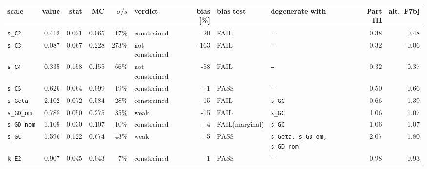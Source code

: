 \begin{tabular}{lrrrrlrll rr}
\toprule
scale & value & stat & MC & $\sigma/s$ & verdict & bias [\%] & bias test & degenerate with & Part III & alt.\ F7bj \\
\midrule
\texttt{s\_C2} & 0.412 & 0.021 & 0.065 & 17\% & constrained & -20 & FAIL & \texttt{--} & 0.38 & 0.48 \\
\texttt{s\_C3} & -0.087 & 0.067 & 0.228 & 273\% & not constrained & -163 & FAIL & \texttt{--} & 0.32 & -0.06 \\
\texttt{s\_C4} & 0.335 & 0.158 & 0.155 & 66\% & not constrained & -58 & FAIL & \texttt{--} & 0.32 & 0.37 \\
\texttt{s\_C5} & 0.626 & 0.064 & 0.099 & 19\% & constrained & +1 & PASS & \texttt{--} & 0.50 & 0.66 \\
\texttt{s\_Geta} & 2.102 & 0.072 & 0.584 & 28\% & constrained & -15 & FAIL & \texttt{s\_GC} & 0.66 & 1.39 \\
\texttt{s\_GD\_om} & 0.788 & 0.050 & 0.275 & 35\% & weak & -15 & FAIL & \texttt{s\_GC} & 1.06 & 1.07 \\
\texttt{s\_GD\_nom} & 1.109 & 0.030 & 0.107 & 10\% & constrained & +4 & FAIL(marginal) & \texttt{s\_GC} & 1.06 & 1.07 \\
\texttt{s\_GC} & 1.596 & 0.122 & 0.674 & 43\% & weak & +5 & PASS & \texttt{s\_Geta, s\_GD\_om, s\_GD\_nom} & 2.07 & 1.80 \\
\texttt{k\_E2} & 0.907 & 0.045 & 0.043 & 7\% & constrained & -1 & PASS & \texttt{--} & 0.98 & 0.93 \\
\bottomrule
\end{tabular}

